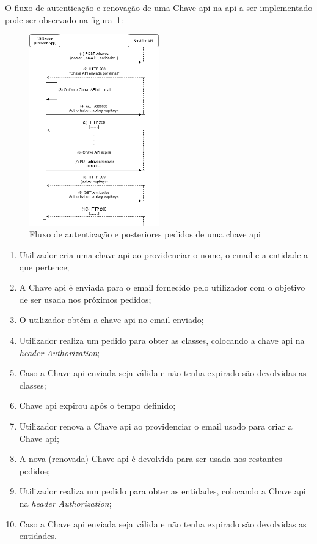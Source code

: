 O fluxo de autenticação e renovação de uma Chave \acrshort{api} na \acrshort{api} a ser implementado pode ser 
observado na figura~\ref{fig:chaveAuth}:
\begin{figure}[H]
    \centering
    \includegraphics[width=0.5\textwidth]{img/chaveAuth.png}
    \caption{Fluxo de autenticação e posteriores pedidos de uma chave \acrshort{api}}\label{fig:chaveAuth}
\end{figure}

\begin{enumerate}
    \item Utilizador cria uma chave \acrshort{api} ao providenciar o nome, o email e a entidade a que pertence;
    \item A Chave \acrshort{api} é enviada para o email fornecido pelo utilizador com o objetivo de ser usada nos 
    próximos pedidos;
    \item O utilizador obtém a chave \acrshort{api} no email enviado;
    \item Utilizador realiza um pedido para obter as classes, colocando a chave \acrshort{api} na 
    \textit{header} \textit{Authorization};
    \item Caso a Chave \acrshort{api} enviada seja válida e não tenha expirado são devolvidas as classes;
    \item Chave \acrshort{api} expirou após o tempo definido;
    \item Utilizador renova a Chave \acrshort{api} ao providenciar o email usado para criar a Chave \acrshort{api};
    \item A nova (renovada) Chave \acrshort{api} é devolvida para ser usada nos restantes pedidos;
    \item Utilizador realiza um pedido para obter as entidades, colocando a Chave \acrshort{api} na 
    \textit{header} \textit{Authorization};
    \item Caso a Chave \acrshort{api} enviada seja válida e não tenha expirado são devolvidas as entidades.
\end{enumerate}

